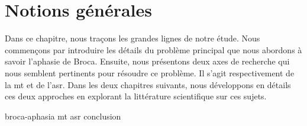 \chapter{Notions générales}
\label{chap.general-notions}
Dans ce chapitre, nous traçons les grandes lignes de notre étude.
Nous commençons par introduire les détails du problème principal que nous abordons à savoir l'aphasie de Broca.
Ensuite, nous présentons deux axes de recherche qui nous semblent pertinents pour résoudre ce problème.
Il s'agit respectivement de la \gls{mt} et de l'\gls{asr}.
Dans les deux chapitres suivants, 
nous développons en détails ces deux approches
en explorant la littérature scientifique sur ces sujets.

{broca-aphasia}
{mt}
{asr}
{conclusion}